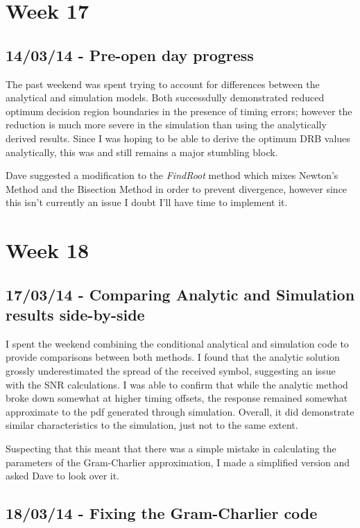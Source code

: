 \section{Week 17}

\subsection{14/03/14 - Pre-open day progress}

The past weekend was spent trying to account for differences between the
analytical and simulation models. Both successdully demonstrated reduced
optimum decision region boundaries in the presence of timing errors;
however the reduction is much more severe in the simulation than using
the analytically derived results. Since I was hoping to be able to
derive the optimum DRB values analytically, this was and still remains a
major stumbling block.

Dave suggested a modification to the \emph{FindRoot} method which mixes
Newton's Method and the Bisection Method in order to prevent divergence,
however since this isn't currently an issue I doubt I'll have time to
implement it.

\section{Week 18}

\subsection{17/03/14 - Comparing Analytic and Simulation results
side-by-side}

I spent the weekend combining the conditional analytical and simulation
code to provide comparisons between both methods. I found that the
analytic solution grossly underestimated the spread of the received
symbol, suggesting an issue with the SNR calculations. I was able to
confirm that while the analytic method broke down somewhat at higher
timing offsets, the response remained somewhat approximate to the pdf
generated through simulation. Overall, it did demonstrate similar
characteristics to the simulation, just not to the same extent.

Suspecting that this meant that there was a simple mistake in
calculating the parameters of the Gram-Charlier approximation, I made a
simplified version and asked Dave to look over it.

\subsection{18/03/14 - Fixing the Gram-Charlier code}

